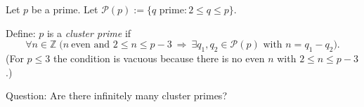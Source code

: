 Let $p$ be a prime. Let $\mathcal P(p):=\{q\text{ prime}: 2\le q\le p\}$.

Define: $p$ is a \emph{cluster prime} if
\[
\forall n\in\mathbb Z\;\Big( n\ \text{even and }2\le n\le p-3\ \Rightarrow\ \exists q_1,q_2\in\mathcal P(p)\text{ with }n=q_1-q_2\Big).
\]
(For $p\le 3$ the condition is vacuous because there is no even $n$ with $2\le n\le p-3$.)

Question: Are there infinitely many cluster primes?

